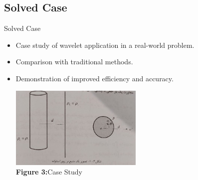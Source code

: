 \documentclass{beamer}
\begin{document}
\subsection{Solved Case}
\begin{frame}{Solved Case}
    \begin{itemize}
        \item Case study of wavelet application in a real-world problem.
        \item Comparison with traditional methods.
        \item Demonstration of improved efficiency and accuracy.\\[0.5cm]
        \vfil
        \centering
        
        \includegraphics[width=0.5\textwidth, height=0.4\textheight]{Case.jpg} %
        \\[0.2cm] %
        {\small \textbf {Figure 3:}Case Study} %
    \end{itemize}
\end{frame}

\end{document}
